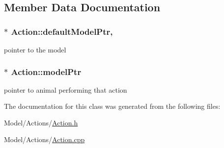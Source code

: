 \subsection{Member Data Documentation}
\hypertarget{class_action_a688c952ee1ee0b25927abd22deadcb4e}{}
\subsubsection[{default\+Model\+Ptr}]{ $\ast$ Action\+::default\+Model\+Ptr\hspace{0.3cm}{\ttfamily [static]}, {\ttfamily [protected]}}\label{class_action_a688c952ee1ee0b25927abd22deadcb4e}
pointer to the model \hypertarget{class_action_a451d89d07a4cfe44be1fc52490907139}{}
\subsubsection[{model\+Ptr}]{$\ast$ Action\+::model\+Ptr\hspace{0.3cm}{\ttfamily [protected]}}\label{class_action_a451d89d07a4cfe44be1fc52490907139}
pointer to animal performing that action 

The documentation for this class was generated from the following files\+:\begin{DoxyCompactItemize}
\item 
Model/\+Actions/\hyperlink{_action_8h}{Action.\+h}\item 
Model/\+Actions/\hyperlink{_action_8cpp}{Action.\+cpp}\end{DoxyCompactItemize}
